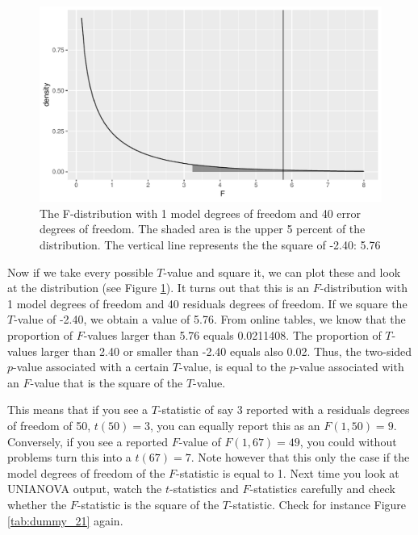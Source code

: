 \documentclass[]{report}\usepackage[]{graphicx}\usepackage[]{color}
\makeatletter
\def\maxwidth{ %
  \ifdim\Gin@nat@width>\linewidth
    \linewidth
  \else
    \Gin@nat@width
  \fi
}
\newenvironment{knitrout}{}{} %
\makeatother
\begin{document}
\begin{knitrout}
\color{fgcolor}\begin{figure}

{\centering \includegraphics[width=\maxwidth]{figure/dummy_24-1} 

}

\caption[The F-distribution with 1 model degrees of freedom and 40 error degrees of freedom]{The F-distribution with 1 model degrees of freedom and 40 error degrees of freedom. The shaded area is the upper 5 percent of the distribution. The vertical line represents the the square of -2.40: 5.76}\label{fig:dummy_24}
\end{figure}


\end{knitrout}


Now if we take every possible $T$-value and square it, we can plot these and look at the distribution (see Figure \ref{fig:dummy_24}). It turns out that this is an $F$-distribution with 1 model degrees of freedom and 40 residuals degrees of freedom. If we square the $T$-value of -2.40, we obtain a value of 5.76. From online tables, we know that the proportion of $F$-values larger than 5.76 equals 0.0211408. The proportion of $T$-values larger than 2.40 or smaller than -2.40 equals also 0.02. Thus, the two-sided $p$-value associated with a certain $T$-value, is equal to the $p$-value associated with an $F$-value that is the square of the $T$-value. 

This means that if you see a $T$-statistic of say 3 reported with a residuals degrees of freedom of 50, $t(50)=3$, you can equally report this as an $F(1,50)=9$. Conversely, if you see a reported $F$-value of $F(1,67)=49$, you could without problems turn this into a $t(67)=7$. Note however that this only the case if the model degrees of freedom of the $F$-statistic is equal to 1. Next time you look at UNIANOVA output, watch the $t$-statistics and $F$-statistics carefully and check whether the $F$-statistic is the square of the $T$-statistic. Check for instance Figure \ref{tab:dummy_21} again.   
\end{document}

